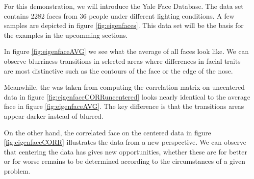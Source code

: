 \begin{minipage}[h][120mm][t]{0.55\linewidth}

    \setlength{\parindent}{2em}

    \bigskip

    \noindent
    For this demonstration, we will introduce the Yale Face Database.
    The data set contains 2282 faces from 36 people under different lighting conditions.
    A few samples are depicted in figure \ref{fig:eigenfaces}.
    This data set will be the basis for the examples in the upcomming sections.

    \bigskip

    In figure \ref{fig:eigenfaceAVG} we see what the average of all faces look like.
    We can observe blurriness transitions in selected areas where differences in facial traits are most distinctive such as the contours of the face or the edge of the nose.

    \medskip

    Meanwhile, the was taken from computing the correlation matrix on uncentered data in figure \ref{fig:eigenfaceCORRuncentered} looks nearly identical to the average face in figure \ref{fig:eigenfaceAVG}.
    The key difference is that the transitions areas appear darker instead of blurred.

    \medskip

    On the other hand, the correlated face on the centered data in figure \ref{fig:eigenfaceCORR} illustrates the data from a new perspective.
    We can observe that centering the data has gives new opportunities, whether these are for better or for worse remains to be determined according to the circumstances of a given problem.


\end{minipage}%
